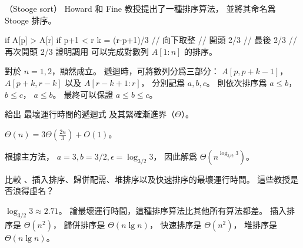 \startPROBLEM
（Stooge sort）
Howard 和 Fine 教授提出了一種排序算法，
並將其命名爲 Stooge 排序。

\startCLRSCODE
if A[p] > A[r]
if p+1 < r
	k = \lfloor (r-p+1)/3 \rfloor	// 向下取整
		// 開頭 2/3
		// 最後 2/3
		// 再次開頭 2/3
\stopCLRSCODE
\startigBase[a]\startitem
證明調用  可以完成對數列 $A[1:n]$ 的排序。
\stopitem\stopigBase

\startANSWER
對於 $n=1,2$，顯然成立。
遞迴時，可將數列分爲三部分： $A[p,p+k-1]$， $A[p+k,r-k]$ 以及 $A[r-k+1:r]$，
分別記爲 $a,b,c$。
則依次排序爲 $a\le b$， $b\le c$， $a\le b$。
最終可以保證 $a\le b\le c$。
\stopANSWER

\startigBase[a,continue]\startitem
給出  最壞運行時間的遞迴式
及其緊確漸進界（$\Theta$）。
\stopitem\stopigBase

\startANSWER
$\Theta(n)=3\Theta(\frac{2n}{3}) + O(1)$。

根據主方法， $a=3,b=3/2,\epsilon=\log_{3/2}3$，
因此解爲 $\Theta(n^{\log_{3/2}3})$。
\stopANSWER

\startigBase[a,continue]\startitem
比較 、插入排序、歸併配需、堆排序以及快速排序的最壞運行時間。
這些教授是否浪得虛名？
\stopitem\stopigBase

\startANSWER
$\log_{3/2}3\approx 2.71$。
論最壞運行時間，這種排序算法比其他所有算法都差。
插入排序是 $\Theta(n^2)$，
歸併排序是 $\Theta(n\lg n)$，
快速排序是 $\Theta(n^2)$，
堆排序是 $\Theta(n\lg n)$。
\stopANSWER

\stopPROBLEM

